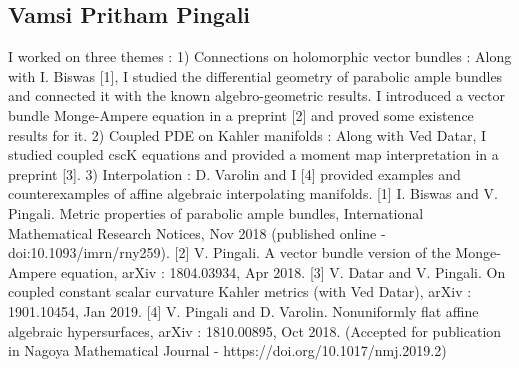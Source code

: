 \subsection{Vamsi Pritham Pingali}

I worked on three themes : 1) Connections on holomorphic vector bundles : Along with I. Biswas [1], I studied the differential geometry of parabolic ample bundles and connected it with the known algebro-geometric results.  I introduced a vector bundle Monge-Ampere equation in a preprint [2] and proved some existence results for it. 2) Coupled PDE on Kahler manifolds : Along with Ved Datar, I studied coupled cscK equations and provided a moment map interpretation in a preprint [3]. 3) Interpolation : D. Varolin and I [4] provided examples and counterexamples of affine algebraic interpolating manifolds.  [1] I. Biswas and V. Pingali. Metric properties of parabolic ample bundles, International Mathematical Research Notices, Nov 2018 (published online - doi:10.1093/imrn/rny259). [2] V. Pingali. A vector bundle version of the Monge-Ampere equation, arXiv : 1804.03934, Apr 2018. [3] V. Datar and V. Pingali. On coupled constant scalar curvature Kahler metrics (with Ved Datar), arXiv : 1901.10454, Jan 2019. [4] V. Pingali and D. Varolin. Nonuniformly flat affine algebraic hypersurfaces, arXiv : 1810.00895, Oct 2018. (Accepted for publication in Nagoya Mathematical Journal -  https://doi.org/10.1017/nmj.2019.2)